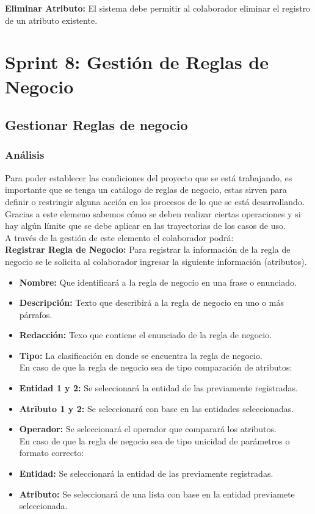 \textbf {Eliminar Atributo:} 
El sistema debe permitir al colaborador eliminar el registro de un atributo existente.\\


\section{Sprint 8: Gestión de Reglas de Negocio}

\subsection{Gestionar Reglas de negocio}
\subsubsection {Análisis}
Para poder establecer las condiciones del proyecto que se está trabajando, es importante que se tenga un catálogo de reglas de negocio, estas sirven para definir o restringir alguna acción en los procesos de lo que se está desarrollando. Gracias a este elemeno sabemos cómo se deben realizar ciertas operaciones y si hay algún límite que se debe aplicar en las trayectorias de los casos de uso.\\

A través de la gestión de este elemento el colaborador podrá:\\

\textbf {Registrar Regla de Negocio:}
Para registrar la información de la regla de negocio se le solicita al colaborador ingresar la siguiente información (atributos).
\begin{itemize}
	\item \textbf{Nombre:} Que identificará a la regla de negocio en una frase o enunciado.
	\item \textbf{Descripción:} Texto que describirá a la regla de negocio  en uno o más párrafos.
	\item \textbf{Redacción:} Texo que contiene el enunciado de la regla de negocio.
	\item \textbf{Tipo:} La clasificación en donde se encuentra la regla de negocio.\\
	En caso de que la regla de negocio sea de tipo comparación de atributos:
	\item \textbf{Entidad 1 y 2:} Se seleccionará la entidad de las previamente registradas.
	\item \textbf{Atributo 1 y 2:} Se seleccionará con base en las entidades seleccionadas.
	\item \textbf{Operador:} Se seleccionará el operador que comparará los atributos.\\
	En caso de que la regla de negocio sea de tipo unicidad de parámetros o formato correcto:
	\item \textbf{Entidad:} Se seleccionará la entidad de las previamente registradas.
	\item \textbf{Atributo:} Se seleccionará de una lista con base en la entidad previamete seleccionada.
\end{itemize}

